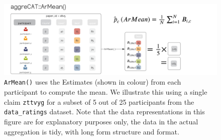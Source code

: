 \documentclass[article]{jss}
\begin{document}
\begin{figure}

{\centering \includegraphics[width=5.6in,height=\textheight]{images/paste-5A70A45F.png}

}

\caption{\label{fig-ArMean}\texttt{ArMean()} uses the Estimates (shown
in colour) from each participant to compute the mean. We illustrate this
using a single claim \texttt{zttvyg} for a subset of 5 out of 25
participants from the \texttt{data\_ratings} dataset. Note that the data
representations in this figure are for explanatory purposes only, the
data in the actual aggregation is tidy, with long form structure and
format.}

\end{figure}
\end{document}
